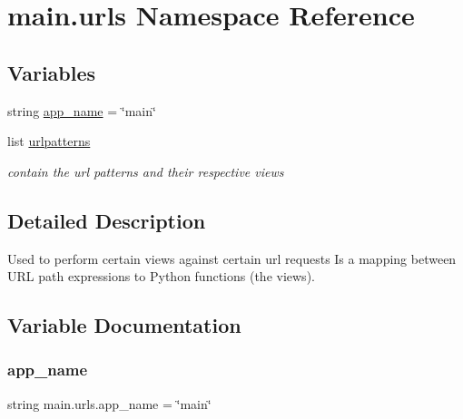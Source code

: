 \hypertarget{namespacemain_1_1urls}{}\section{main.\+urls Namespace Reference}
\label{namespacemain_1_1urls}
\subsection*{Variables}
\begin{DoxyCompactItemize}
\item 
string \hyperlink{namespacemain_1_1urls_a51dcca3e024577b219fd64d918455026}{app\+\_\+name} = \char`\"{}main\char`\"{}
\item 
list \hyperlink{namespacemain_1_1urls_a49ff062cbecb056ec955c38ee8b784c3}{urlpatterns}
\begin{DoxyCompactList}\small\item\em contain the url patterns and their respective views \end{DoxyCompactList}\end{DoxyCompactItemize}


\subsection{Detailed Description}
\begin{DoxyVerb}Used to perform certain views against certain url requests
Is a mapping between URL path expressions to Python functions (the views).
\end{DoxyVerb}
 

\subsection{Variable Documentation}
\mbox{\label{namespacemain_1_1urls_a51dcca3e024577b219fd64d918455026}} 
\subsubsection{\texorpdfstring{app\+\_\+name}{app\_name}}
{\footnotesize\ttfamily string main.\+urls.\+app\+\_\+name = \char`\"{}main\char`\"{}}

\mbox{\label{namespacemain_1_1urls_a49ff062cbecb056ec955c38ee8b784c3}} 
